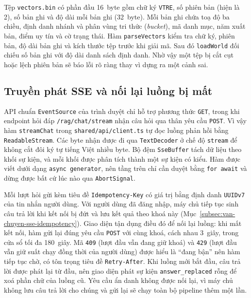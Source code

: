 Tệp \texttt{vectors.bin} có phần đầu 16~byte gồm chữ ký \texttt{VTRE}, số phiên bản (hiện là 2), số bản ghi và độ dài mỗi bản ghi (32~byte). Mỗi bản ghi chứa toạ độ ba chiều, định danh nhánh và phân vùng tri thức (\textit{bucket}), mã danh mục, năm xuất bản, điểm uy tín và cờ trạng thái. Hàm \texttt{parseVectors} kiểm tra chữ ký, phiên bản, độ dài bản ghi và kích thước tệp trước khi giải mã. Sau đó \texttt{loadWorld} đối chiếu số bản ghi với độ dài danh sách định danh. Nhờ vậy một tệp bị cắt cụt hoặc lệch phiên bản sẽ báo lỗi rõ ràng thay vì dựng ra một cảnh sai.

\subsection{Truyền phát SSE và nối lại luồng bị mất}
\label{subsec:fe-sse}

API chuẩn \texttt{EventSource} của trình duyệt chỉ hỗ trợ phương thức \texttt{GET}, trong khi endpoint hỏi đáp \texttt{/rag/chat/stream} nhận câu hỏi qua thân yêu cầu \texttt{POST}. Vì vậy hàm \texttt{streamChat} trong \texttt{shared/\allowbreak{}api/\allowbreak{}client.ts} tự đọc luồng phản hồi bằng \texttt{ReadableStream}. Các byte nhận được đi qua \texttt{TextDecoder} ở chế độ \texttt{stream} để không cắt đôi ký tự tiếng Việt nhiều byte. Bộ đệm \texttt{SseBuffer} tách dữ liệu theo khối sự kiện, và mỗi khối được phân tích thành một sự kiện có kiểu. Hàm được viết dưới dạng \texttt{async generator}, nên tầng trên chỉ cần duyệt bằng \texttt{for await} và dừng được bất cứ lúc nào qua \texttt{AbortSignal}.

Mỗi lượt hỏi gửi kèm tiêu đề \texttt{Idempotency-Key} có giá trị bằng định danh \texttt{UUIDv7} của tin nhắn người dùng. Với người dùng đã đăng nhập, máy chủ tiếp tục sinh câu trả lời khi kết nối bị đứt và lưu kết quả theo khoá này (Mục~\ref{subsec:van-chuyen-sse-idempotency}). Giao diện tận dụng điều đó để nối lại luồng: khi mất kết nối, hàm gửi lại đúng yêu cầu \texttt{POST} với cùng khoá, cách nhau 3~giây, trong cửa sổ tối đa 180~giây. Mã \texttt{409} (lượt đầu vẫn đang giữ khoá) và \texttt{429} (lượt đầu vẫn giữ suất chạy đồng thời của người dùng) được hiểu là ``đang bận'' nên hàm tiếp tục chờ, có tôn trọng tiêu đề \texttt{Retry-After}. Khi luồng mới bắt đầu, câu trả lời được phát lại từ đầu, nên giao diện phát sự kiện \texttt{answer\_\allowbreak{}replaced} rỗng để xoá phần chữ của luồng cũ. Yêu cầu ẩn danh không được nối lại, vì máy chủ không lưu câu trả lời cho chúng và gửi lại sẽ chạy toàn bộ pipeline thêm một lần.

